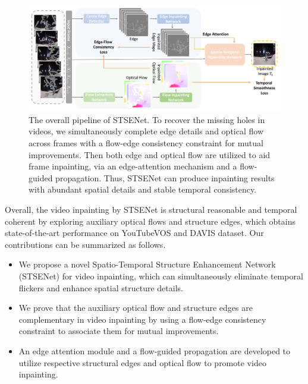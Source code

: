 \documentclass[letterpaper]{article} %
\begin{document}
\begin{figure}[t]
	\centering
	\includegraphics[width=2.0\columnwidth]{zong} %
	\caption{The overall pipeline of STSENet. To recover the missing holes in videos, we simultaneously complete edge details and optical flow across frames with a flow-edge consistency constraint for mutual improvements. Then both edge and optical flow are utilized to aid frame inpainting, via an edge-attention mechanism and a flow-guided propagation. Thus, STSENet can produce inpainting results with abundant spatial details and stable temporal consistency.}
	\label{zong}
\end{figure}




Overall, the video inpainting by STSENet is structural reasonable and temporal coherent by exploring auxiliary optical flows and structure edges, which obtains state-of-the-art performance on YouTubeVOS and DAVIS dataset. Our contributions can be summarized as follows.
\begin{itemize}
	\item We propose a novel Spatio-Temporal Structure Enhancement Network (STSENet) for video inpainting, which can simultaneously eliminate temporal flickers and enhance spatial structure details.
	\item We prove that the auxiliary optical flow and structure edges are complementary in video inpainting by using a flow-edge consistency constraint to associate them for mutual improvements.
	\item An edge attention module and a flow-guided propagation are developed to utilize respective structural edges and optical flow to promote video inpainting.			
\end{itemize}
















 

 
\end{document}
